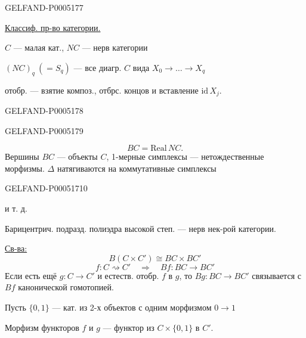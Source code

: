 \begin{GelfandAdjacentEvidence}{GELFAND-P000517}{7}


\uline{Классиф. пр-во категории.}

$C$ — малая кат., $NC$ — нерв категории

$(NC)_q\ (=S_q)$ — все диагр. $C$ вида $X_0\to\ldots\to X_q$

отобр. — взятие композ., отбрс. концов и вставление $\mathrm{id}\,X_j$.
\end{GelfandAdjacentEvidence}
\begin{GelfandAdjacentEvidence}{GELFAND-P000517}{8}

\end{GelfandAdjacentEvidence}
\begin{GelfandAdjacentEvidence}{GELFAND-P000517}{9}

\[
BC=\mathrm{Real}\,NC.
\]
Вершины $BC$ — объекты $C$, 1-мерные симплексы — нетождественные морфизмы.
$\Delta$ натягиваются на коммутативные симплексы
\end{GelfandAdjacentEvidence}
\begin{GelfandAdjacentEvidence}{GELFAND-P000517}{10}

и т. д.

Барицентрич. подразд. полиэдра высокой степ. — нерв нек-рой категории.
\end{GelfandAdjacentEvidence}


\uline{Св-ва:}
\[
B(C\times C')\cong BC\times BC'
\]
\[
f:C\rightsquigarrow C'\quad\Rightarrow\quad Bf:BC\to BC'
\]
Если есть ещё $g:C\to C'$ и естеств. отобр. $f$ в $g$, то
$Bg:BC\to BC'$ связывается с $Bf$ канонической гомотопией.

Пусть $\{0,1\}$ — кат. из 2-х объектов с одним морфизмом $0\to1$

Морфизм функторов $f$ и $g$ — функтор из $C\times\{0,1\}$ в $C'$.


